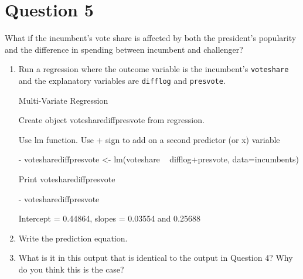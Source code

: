 \documentclass[12pt,letterpaper]{article}
\begin{document}
\section*{Question 5}%
\noindent What if the incumbent's vote share is affected by both the president's popularity and the difference in spending between incumbent and challenger? 
	\begin{enumerate}
		\item Run a regression where the outcome variable is the incumbent's \texttt{voteshare} and the explanatory variables are \texttt{difflog} and \texttt{presvote}.	\vspace{5cm}
		
		Multi-Variate Regression 
	
	Create object votesharediffpresvote from regression. 
	
	Use lm function. Use + sign to add on a second predictor (or x) variable
	
- votesharediffpresvote <- lm(voteshare ~ difflog+presvote, data=incumbents)

Print votesharediffpresvote

-	votesharediffpresvote 

Intercept = 0.44864, slopes = 0.03554 and 0.25688

		\item Write the prediction equation.	\vspace{5cm}
		
		
		\item What is it in this output that is identical to the output in Question 4? Why do you think this is the case?%
	\end{enumerate}
\end{document}
